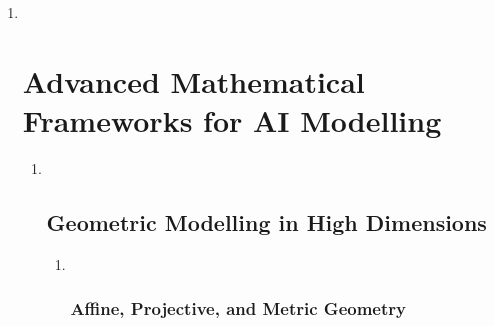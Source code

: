 \documentclass[
]{article}
\begin{document}
\begin{enumerate}
\def\labelenumi{\arabic{enumi}.}
\setcounter{enumi}{4}
\item ~
  \hypertarget{advanced-mathematical-frameworks-for-ai-modelling}{%
  \section{Advanced Mathematical Frameworks for AI
  Modelling}\label{advanced-mathematical-frameworks-for-ai-modelling}}

  \begin{enumerate}
  \def\labelenumii{\arabic{enumii}.}
  \item ~
    \hypertarget{geometric-modelling-in-high-dimensions}{%
    \subsection{Geometric Modelling in High
    Dimensions}\label{geometric-modelling-in-high-dimensions}}

    \begin{enumerate}
    \def\labelenumiii{\arabic{enumiii}.}
    \item ~
      \hypertarget{affine-projective-and-metric-geometry}{%
      \subsubsection{Affine, Projective, and Metric
      Geometry}\label{affine-projective-and-metric-geometry}}
    \end{enumerate}
  \end{enumerate}
\end{enumerate}
\end{document}
